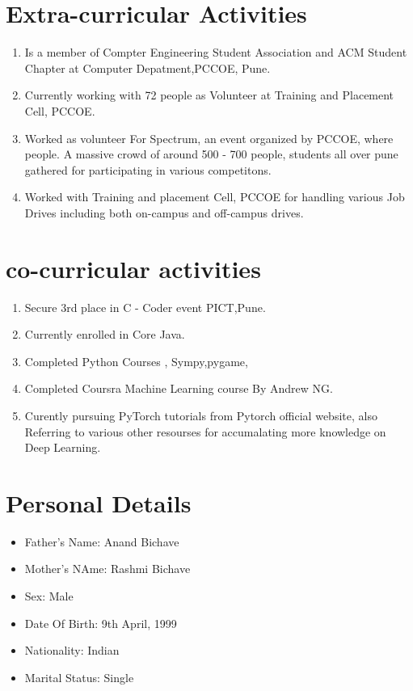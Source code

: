 \documentclass[10pt]{article}
\begin{document}
\section{Extra-curricular Activities}
\begin{enumerate}
\item Is a member of Compter Engineering Student Association and ACM Student Chapter at Computer Depatment,PCCOE, Pune.
\item Currently working with 72 people as Volunteer at Training and Placement Cell, PCCOE.
\item Worked as volunteer For Spectrum, an event organized by PCCOE, where people.  A massive crowd of around 500 - 700 people, students all over pune gathered for participating in various competitons.
\item Worked with Training and placement Cell, PCCOE for handling various Job Drives including both on-campus and off-campus drives.
\end{enumerate}


\section{co-curricular activities}
\begin{enumerate}
\item Secure 3rd place in C - Coder event PICT,Pune.
\item Currently enrolled in Core Java.
\item Completed Python Courses , Sympy,pygame, 
\item Completed Coursra Machine Learning course By Andrew NG. 
\item Curently pursuing PyTorch tutorials from Pytorch official website, also Referring to various other resourses for accumalating more knowledge on Deep Learning.
\end{enumerate}


\section{Personal Details} 
\begin{itemize}

\item{Father's Name: Anand Bichave}
\item{Mother's NAme: Rashmi Bichave}
\item{Sex: Male}
\item{Date Of Birth: 9th April, 1999}
\item{Nationality: Indian}
\item{Marital Status: Single}

\end{itemize}
\end{document}

